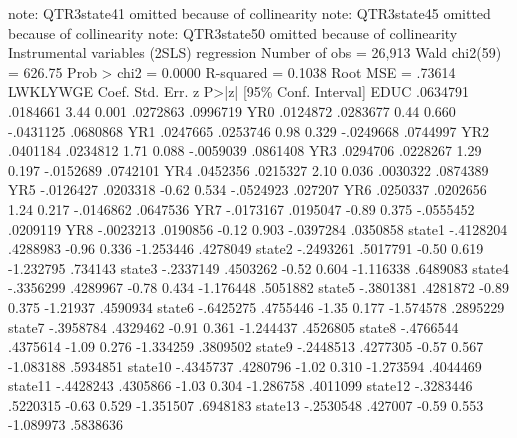 note: QTR3state41 omitted because of collinearity
note: QTR3state45 omitted because of collinearity
note: QTR3state50 omitted because of collinearity
{\smallskip}
Instrumental variables (2SLS) regression          Number of obs   =     26,913
                                                  Wald chi2(59)   =     626.75
                                                  Prob > chi2     =     0.0000
                                                  R-squared       =     0.1038
                                                  Root MSE        =     .73614
{\smallskip}
    LWKLYWGE {\VBAR}      Coef.   Std. Err.      z    P>|z|     [95\% Conf. Interval]
        EDUC {\VBAR}   .0634791   .0184661     3.44   0.001     .0272863    .0996719
         YR0 {\VBAR}   .0124872   .0283677     0.44   0.660    -.0431125    .0680868
         YR1 {\VBAR}   .0247665   .0253746     0.98   0.329    -.0249668    .0744997
         YR2 {\VBAR}   .0401184   .0234812     1.71   0.088    -.0059039    .0861408
         YR3 {\VBAR}   .0294706   .0228267     1.29   0.197    -.0152689    .0742101
         YR4 {\VBAR}   .0452356   .0215327     2.10   0.036     .0030322    .0874389
         YR5 {\VBAR}  -.0126427   .0203318    -0.62   0.534    -.0524923     .027207
         YR6 {\VBAR}   .0250337   .0202656     1.24   0.217    -.0146862    .0647536
         YR7 {\VBAR}  -.0173167   .0195047    -0.89   0.375    -.0555452    .0209119
         YR8 {\VBAR}  -.0023213   .0190856    -0.12   0.903    -.0397284    .0350858
      state1 {\VBAR}  -.4128204   .4288983    -0.96   0.336    -1.253446    .4278049
      state2 {\VBAR}  -.2493261   .5017791    -0.50   0.619    -1.232795     .734143
      state3 {\VBAR}  -.2337149   .4503262    -0.52   0.604    -1.116338    .6489083
      state4 {\VBAR}  -.3356299   .4289967    -0.78   0.434    -1.176448    .5051882
      state5 {\VBAR}  -.3801381   .4281872    -0.89   0.375     -1.21937    .4590934
      state6 {\VBAR}  -.6425275   .4755446    -1.35   0.177    -1.574578    .2895229
      state7 {\VBAR}  -.3958784   .4329462    -0.91   0.361    -1.244437    .4526805
      state8 {\VBAR}  -.4766544   .4375614    -1.09   0.276    -1.334259    .3809502
      state9 {\VBAR}  -.2448513   .4277305    -0.57   0.567    -1.083188    .5934851
     state10 {\VBAR}  -.4345737   .4280796    -1.02   0.310    -1.273594    .4044469
     state11 {\VBAR}  -.4428243   .4305866    -1.03   0.304    -1.286758    .4011099
     state12 {\VBAR}  -.3283446   .5220315    -0.63   0.529    -1.351507    .6948183
     state13 {\VBAR}  -.2530548    .427007    -0.59   0.553    -1.089973    .5838636

